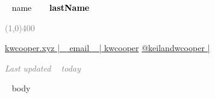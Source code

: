 \documentclass[11pt]{template3/cooperCV} %
\begin{document}
\begin{center}
\HUGE\textcolor{black}{~{{ name }}~}
\HUGE\textcolor{black}{\textbf{~{{ lastName }}~}}
\end{center}

\begin{center}
\textcolor{gray}{\line(1,0){400}}
\end{center}

\begin{center}
\footnotesize 
\href{https://kwcooper.xyz}{\faHome \hspace{0.05cm} kwcooper.xyz | \hspace{0.1cm}}
\href{mailto: ~{{ email }}~ }{\faEnvelope \hspace{0.05cm} ~{{ email }}~ | \hspace{0.1cm}} 
\href{https://github.com/kwcooper}{\faGithub \hspace{0.05cm} kwcooper} 
\href{https://twitter.com/kwcooper}{\faTwitter \hspace{0.05cm} @keilandwcooper | \hspace{0.1cm}} 
\end{center}

\begin{center} \footnotesize \emph{\textcolor{gray}{Last updated ~{{ today }}~}} \end{center}
\vspace{0.7cm}




\begin{flushright}
\vspace{3.5mm}

\end{flushright}
\vspace{-18mm}

~{{ body }}~


\end{document}
